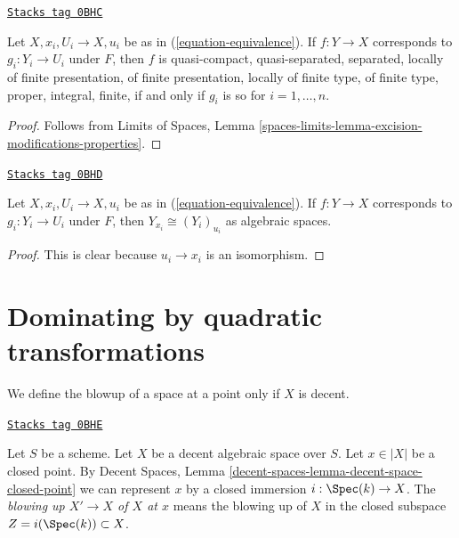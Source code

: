 \begin{lemma}
\label{spaces-resolve-lemma-equivalence-properties}
\href{https://stacks.math.columbia.edu/tag/0BHC}{\texttt{Stacks tag 0BHC}}

Let $X, x_i, U_i \to X, u_i$ be as in (\ref{equation-equivalence}).
If $f : Y \to X$ corresponds to $g_i : Y_i \to U_i$ under $F$,
then $f$ is quasi-compact, quasi-separated, separated, locally of finite
presentation, of finite presentation, locally of finite type, of finite type,
proper, integral, finite, if and only if $g_i$ is so
for $i = 1, \ldots, n$.
\end{lemma}

\begin{proof}
Follows from Limits of Spaces, Lemma
\ref{spaces-limits-lemma-excision-modifications-properties}.
\end{proof}

\begin{lemma}
\label{spaces-resolve-lemma-equivalence-fibre}
\href{https://stacks.math.columbia.edu/tag/0BHD}{\texttt{Stacks tag 0BHD}}

Let $X, x_i, U_i \to X, u_i$ be as in (\ref{equation-equivalence}).
If $f : Y \to X$ corresponds to $g_i : Y_i \to U_i$ under $F$,
then $Y_{x_i} \cong (Y_i)_{u_i}$ as algebraic spaces.
\end{lemma}

\begin{proof}
This is clear because $u_i \to x_i$ is an isomorphism.
\end{proof}

\section{Dominating by quadratic transformations}
\label{spaces-resolve-section-quadratic-spaces}
We define the blowup of a space at a point only if $X$ is decent.

\begin{definition}
\label{spaces-resolve-definition-blowup-at-point}
\href{https://stacks.math.columbia.edu/tag/0BHE}{\texttt{Stacks tag 0BHE}}

Let $S$ be a scheme. Let $X$ be a decent algebraic space over $S$.
Let $x \in |X|$ be a closed point. By
Decent Spaces, Lemma \ref{decent-spaces-lemma-decent-space-closed-point}
we can represent $x$ by a closed immersion $i : \Spec(k) \to X$.
The {\it blowing up $X' \to X$ of $X$ at $x$} means the blowing up of $X$
in the closed subspace $Z = i(\Spec(k)) \subset X$.
\end{definition}

